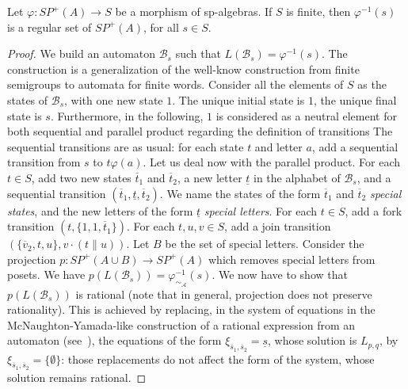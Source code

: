 \documentclass{CSML}
\begin{document}
\begin{lem}
  \label{lem:revImageRatEltFinite}
  Let $\varphi: SP^+(A)\to S$ be a morphism of sp-algebras.
  If $S$ is finite, then $\varphi^{-1}(s)$ is a regular set of $SP^+(A)$, for all $s\in S$.
\end{lem}

\begin{proof}
  We build an automaton $\mathcal{B}_s$ such that $L(\mathcal{B}_s)=\varphi^{-1}(s)$.
 The construction is a generalization of the well-know construction from finite semigroups to automata for finite words.
 Consider all the elements of $S$ as the states of $\mathcal{B}_s$, with one new state $1$. The unique initial state is $1$, the unique final state is $s$. Furthermore, in the following, $1$ is considered as a neutral element for both sequential and parallel product regarding the definition of transitions
 The sequential transitions are as usual: for each state $t$ and letter $a$, add a sequential transition from $s$ to $t\varphi(a)$.
 Let us deal now with the parallel product. For each $t\in S$, add two new states $\overline{t}_1$ and $\overline{t}_2$, a new letter $\underline{t}$ in the alphabet of $\mathcal{B}_s$, and a sequential transition $(\overline{t}_1,\underline{t},\overline{t}_2)$. We name the states of the form $\overline{t}_1$ and $\overline{t}_2$ \emph{special states}, and the new letters of the form $\underline{t}$ \emph{special letters}. For each $t\in S$, add a fork transition $(t,\{1,1,\overline{t}_1\})$. For each $t,u,v\in S$, add a join transition $(\{\overline{v}_2,t,u\},v\cdot(t\parallel u))$. Let $B$ be the set of special letters. Consider the projection $p:SP^+(A\cup B)\to SP^+(A)$ which removes special letters from posets. We have $p(L(\mathcal{B}_s))=\varphi^{-1}_{\sim_\mathcal{A}}(s)$. We now have to show that $p(L(\mathcal{B}_s))$ is rational (note that in general, projection does not preserve rationality). This is achieved by replacing, in the system of equations in the McNaughton-Yamada-like construction of a rational expression from an automaton (see~\cite[Section~4.2]{lodaya98kleene}), the equations of the form $\xi_{\overline{s}_1,\overline{s}_2}=\underline{s}$, whose solution is $L_{p,q}$, by $\xi_{\overline{s}_1,\overline{s}_2}=\{\emptyset\}$: those replacements do not affect the form of the system, whose solution remains rational.
\end{proof}
\end{document}
